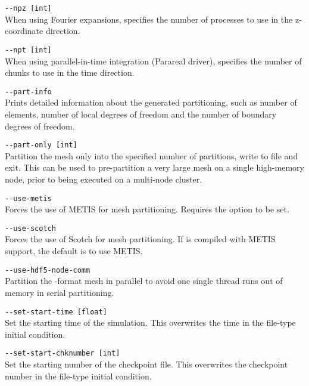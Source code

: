 \lstinline[style=BashInputStyle]{--npz [int]}\\
\hangindent=1.5cm
When using Fourier expansions, specifies the number of processes to use in the z-coordinate direction.

\lstinline[style=BashInputStyle]{--npt [int]}\\
\hangindent=1.5cm
When using parallel-in-time integration (Parareal driver), specifies the number of chunks to use in the time direction.

\lstinline[style=BashInputStyle]{--part-info}\\
\hangindent=1.5cm
Prints detailed information about the generated partitioning, such as number of
elements, number of local degrees of freedom and the number of boundary degrees
of freedom.

\lstinline[style=BashInputStyle]{--part-only [int]}\\
\hangindent=1.5cm
Partition the mesh only into the specified number of partitions, write to file
and exit. This can be used to pre-partition a very large mesh on a single
high-memory node, prior to being executed on a multi-node cluster.

\lstinline[style=BashInputStyle]{--use-metis}\\
\hangindent=1.5cm
Forces the use of METIS for mesh partitioning. Requires the
 option to be set.

\lstinline[style=BashInputStyle]{--use-scotch}\\
\hangindent=1.5cm
Forces the use of Scotch for mesh partitioning. If \nekpp{} is compiled with
METIS support, the default is to use METIS.

\lstinline[style=BashInputStyle]{--use-hdf5-node-comm}\\
\hangindent=1.5cm
Partition the -format mesh in parallel to avoid one single thread runs out of memory in serial partitioning.

\lstinline[style=BashInputStyle]{--set-start-time [float]}\\
\hangindent=1.5cm
Set the starting time of the simulation. This overwrites the time in the file-type initial condition.

\lstinline[style=BashInputStyle]{--set-start-chknumber [int]}\\
\hangindent=1.5cm
Set the starting number of the checkpoint file. This overwrites the checkpoint number in the file-type initial condition.

